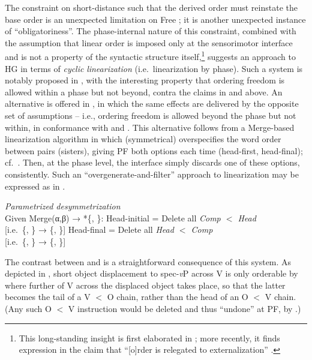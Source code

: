 \documentclass[output=paper]{langsci/langscibook}
\begin{document}
The constraint on short-distance  such that the derived order must
reinstate the base order is an unexpected limitation on Free ; it is
another unexpected instance of \enquote{obligatoriness}. The phase-internal nature of
this constraint, combined with the assumption that linear order is imposed only
at the sensorimotor interface and is not a property of the syntactic structure
itself,\footnote{This long-standing insight is first elaborated in
    \textcite[334--340]{Chomsky1995}; more recently, it finds expression in the
    claim that \enquote{[o]rder is relegated to externalization}
\citep[4]{Chomsky2015}.} suggests an approach to \gls{HG} in terms of \emph{cyclic}
\emph{linearization} (i.e.\ linearization by phase). Such a system is notably
proposed in \citet{FoxPes2005}, with the interesting property that
ordering freedom is allowed within a phase but not beyond, contra the claims in
 and  above. An alternative is offered in
\textcite{Richards2004,Richards2007b}, in which the same effects are delivered
by the opposite set of assumptions -- i.e., ordering freedom is allowed beyond
the phase but not within, in conformance with  and
. This alternative follows from a Merge-based linearization
algorithm in which (symmetrical)  overspecifies the word order
between  pairs (sisters), giving \gls{PF} both options each time
(head-first, head-final); cf.\ \citealt{EpsGroKawKit1998}.  Then, at the
phase level, the interface simply discards one of these options,
consistently. Such an \enquote{overgenerate-and-filter} approach to
linearization may be expressed as in .

\ea\label{ex:key:22.7}\emph{Parametrized desymmetrization}\\
    Given Merge(α,β) → *\{, \}:
    \ea\label{ex:key:22.7a} Head-initial = Delete all \emph{Comp $<$ Head}\\
    {}[i.e.\ \{, \} → \{, \sout{}\}]
    \ex\label{ex:key:22.7b} Head-final = Delete all \emph{Head $<$ Comp}\\
    {}[i.e.\ \{, \} → \{\sout{}, \}]
    \z
\z

The contrast between  and  is a
straightforward consequence of this system. As depicted in ,
short object displacement to spec-\emph{v}P across V is only orderable by
 where further  of V across the displaced object
takes place, so that the latter becomes the tail of a V $<$ O chain, rather
than the head of an O $<$ V chain. (Any such O $<$ V instruction would be
deleted and thus \enquote{undone} at \gls{PF}, by
.)\largerpage[2]
\end{document}
